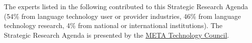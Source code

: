 \documentclass[10pt, plain]{../../metanetpaper}
\begin{document}
\clearpage


\label{sec:list-of-contributors}

\begin{small}
The experts listed in the following contributed to this Strategic Research Agenda (54\% from language technology user or provider industries, 46\% from language technology research, 4\% from national or international institutions). The Strategic Research Agenda is presented by the \href{http://www.meta-net.eu/vision/technology-council-members/all}{META Technology Council}.
\end{small}

%
\end{document}

